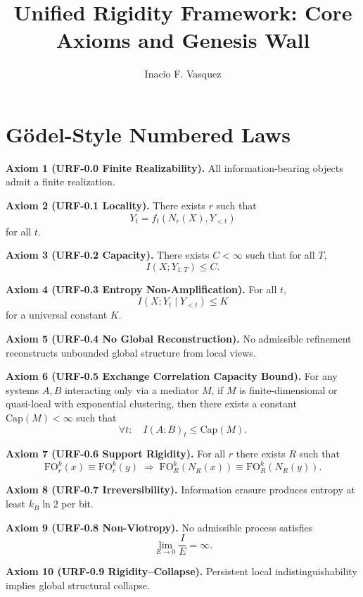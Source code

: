 \documentclass[11pt]{article}
\title{Unified Rigidity Framework: Core Axioms and Genesis Wall}
\author{Inacio F. Vasquez}
\date{}
\begin{document}
\maketitle




\section*{Gödel-Style Numbered Laws}

\textbf{Axiom 1 (URF-0.0 Finite Realizability).}  
All information-bearing objects admit a finite realization.

\textbf{Axiom 2 (URF-0.1 Locality).}  
There exists $r$ such that
\[
Y_t = f_t(N_r(X), Y_{<t})
\]
for all $t$.

\textbf{Axiom 3 (URF-0.2 Capacity).}  
There exists $C<\infty$ such that for all $T$,
\[
I(X;Y_{1:T}) \le C.
\]

\textbf{Axiom 4 (URF-0.3 Entropy Non-Amplification).}  
For all $t$,
\[
I(X;Y_t \mid Y_{<t}) \le K
\]
for a universal constant $K$.

\textbf{Axiom 5 (URF-0.4 No Global Reconstruction).}  
No admissible refinement reconstructs unbounded global structure from local views.

\bigskip

\textbf{Axiom 6 (URF-0.5 Exchange Correlation Capacity Bound).}  
For any systems $A,B$ interacting only via a mediator $M$, if $M$ is
finite-dimensional or quasi-local with exponential clustering, then
there exists a constant $\mathrm{Cap}(M)<\infty$ such that
\[
\forall t:\quad I(A:B)_t \le \mathrm{Cap}(M).
\]

\bigskip

\textbf{Axiom 7 (URF-0.6 Support Rigidity).}  
For all $r$ there exists $R$ such that
\[
\mathrm{FO}^k_r(x) \equiv \mathrm{FO}^k_r(y)
\;\Rightarrow\;
\mathrm{FO}^k_R(N_R(x)) \equiv \mathrm{FO}^k_R(N_R(y)).
\]

\textbf{Axiom 8 (URF-0.7 Irreversibility).}  
Information erasure produces entropy at least $k_B \ln 2$ per bit.

\textbf{Axiom 9 (URF-0.8 Non-Viotropy).}  
No admissible process satisfies
\[
\lim_{E\to 0} \frac{I}{E} = \infty.
\]

\textbf{Axiom 10 (URF-0.9 Rigidity–Collapse).}  
Persistent local indistinguishability implies global structural collapse.

\bigskip
\end{document}
